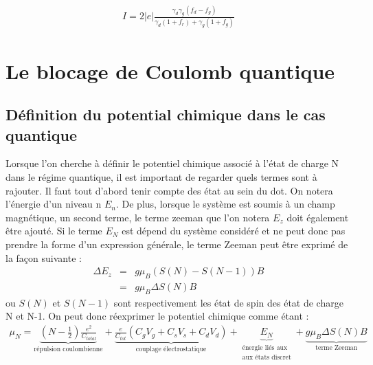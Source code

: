 \begin{eqnarray}
I = 2 |e| \frac{\gamma_d \gamma_g (f_d - f_g)}{\gamma_d(1+f_r) + \gamma_g(1 + f_g)}
\end{eqnarray}




\section{Le blocage de Coulomb quantique}

\subsection{Définition du potential chimique dans le cas quantique}
Lorsque l'on cherche à définir le potentiel chimique associé à l'état de charge N dans le régime quantique, il est important de regarder quels termes sont à rajouter. Il faut tout d'abord tenir compte des état au sein du dot. On notera l'énergie d'un niveau n $E_n$. De plus, lorsque le système est soumis à un champ magnétique, un second terme, le terme zeeman que l'on notera $E_z$ doit également \^etre ajouté. Si le terme $E_N$ est dépend du système considéré et ne peut donc pas prendre la forme d'un expression générale, le terme Zeeman peut \^etre exprimé de la façon suivante :
\begin{eqnarray}
\Delta E_z &=& g \mu_B (S(N) - S(N-1))B \\
&=&g \mu_B \Delta S(N)B
\end{eqnarray}
ou $S(N)$ et $S(N-1)$ sont respectivement les état de spin des état de charge N et N-1. On peut donc réexprimer le potentiel chimique comme étant :
\begin{eqnarray}
\mu_N = 
\underbrace{(N-\frac{1}{2})\frac{e^2}{C_{total}}}_{\text{répulsion coulombienne}} 
+ 
\underbrace{\frac{e}{C_{tot}}(C_gV_g + C_sV_s + C_dV_d)}_{\text{couplage électrostatique}}
+
\underbrace{E_N}_{\substack{\text{énergie liés aux} \\\text{aux états discret}}}
+
\underbrace{g \mu_B \Delta S(N)B}_{\text{terme Zeeman}}
\end{eqnarray}

